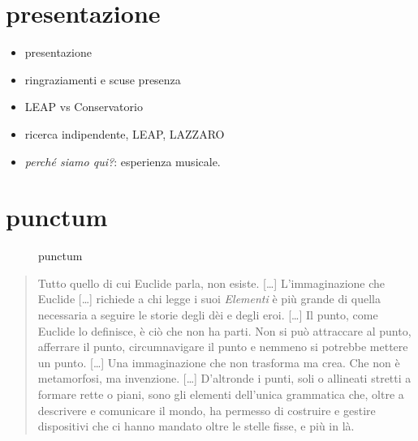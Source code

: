 \section*{presentazione}

\begin{itemize}
  \item presentazione
  \item ringraziamenti e scuse presenza
  \item LEAP vs Conservatorio
  \item ricerca indipendente, LEAP, LAZZARO
  \item \emph{perché siamo qui?}: esperienza musicale.
\end{itemize}


\section{punctum}

\begin{figure}[htbp]
\begin{center}
\caption{punctum}
\label{slide1}
\end{center}
\end{figure}

\begin{quote}
  Tutto quello di cui Euclide parla, non esiste. [\ldots] L'immaginazione che Euclide [\ldots] richiede a chi legge i suoi \emph{Elementi} è più grande di quella necessaria a seguire le storie degli dèi e degli eroi. [\ldots] Il punto, come Euclide lo definisce, è ciò che non ha parti. Non si può attraccare al punto, afferrare il punto, circumnavigare il punto e nemmeno si potrebbe mettere un punto. [\ldots] Una immaginazione che non trasforma ma crea. Che non è metamorfosi, ma invenzione. [\ldots] D'altronde i punti, soli o allineati stretti a formare rette o piani, sono gli elementi dell'unica grammatica che, oltre a descrivere e comunicare il mondo, ha permesso di costruire e gestire dispositivi che ci hanno mandato oltre le stelle fisse, e più in là. \cite{valerio16}
\end{quote}

